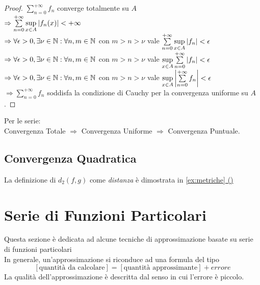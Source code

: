 \begin{proof}
	$\sum\limits_{n=0}^{+\infty}f_n$ converge totalmente su $A$\\
	$\Rightarrow \sum\limits_{n=0}^{+\infty}\sup\limits_{x\in A}\left|f_n(x)\right|<+\infty$\\
	$\Rightarrow \forall\epsilon>0, \exists\nu\in\mathbb{N}: \forall n,m\in\mathbb{N}$ con $m>n>\nu$ vale $\sum\limits_{n=0}^{+\infty}\sup\limits_{x\in A}\left|f_n\right|<\epsilon$\\
	$\Rightarrow \forall\epsilon>0, \exists\nu\in\mathbb{N}: \forall n,m\in\mathbb{N}$ con $m>n>\nu$ vale $\sup\limits_{x\in A}\sum\limits_{n=0}^{+\infty}\left|f_n\right|<\epsilon$\\
	$\Rightarrow \forall\epsilon>0, \exists\nu\in\mathbb{N}: \forall n,m\in\mathbb{N}$ con $m>n>\nu$ vale $\sup\limits_{x\in A}\left|\sum\limits_{n=0}^{+\infty}f_n\right|<\epsilon$\\
	$\Rightarrow \sum\limits_{n=0}^{+\infty}f_n$ soddisfa la condizione di Cauchy per la convergenza uniforme su $A$.
\end{proof}
\observation
Per le serie:\\
Convergenza Totale $\Rightarrow$ Convergenza Uniforme $\Rightarrow$ Convergenza Puntuale.
\subsection{Convergenza Quadratica}
\begin{proposition}
	\label{def:dist_quadratica}

	La definizione di $d_2(f,g)$ come \textit{distanza} è dimostrata in \hyperref[ex:dim_dist_quadratica]{\cref*{ex:metriche} ()}\\
\end{proposition}
\begin{proposition}
	\label{prop:dist_quad_sp_metr_non_compl}
\end{proposition}

\newpage
\section{Serie di Funzioni Particolari}
Questa sezione è dedicata ad alcune tecniche di approssimazione  basate su serie di funzioni particolari\\
In generale, un'approssimazione si riconduce ad una formula del tipo\\
\[\left[\text{quantità da calcolare}\right]=\left[\text{quantità approssimante}\right]+ errore\]
La qualità dell'approssimazione è descritta dal senso in cui l'errore è piccolo.\\
